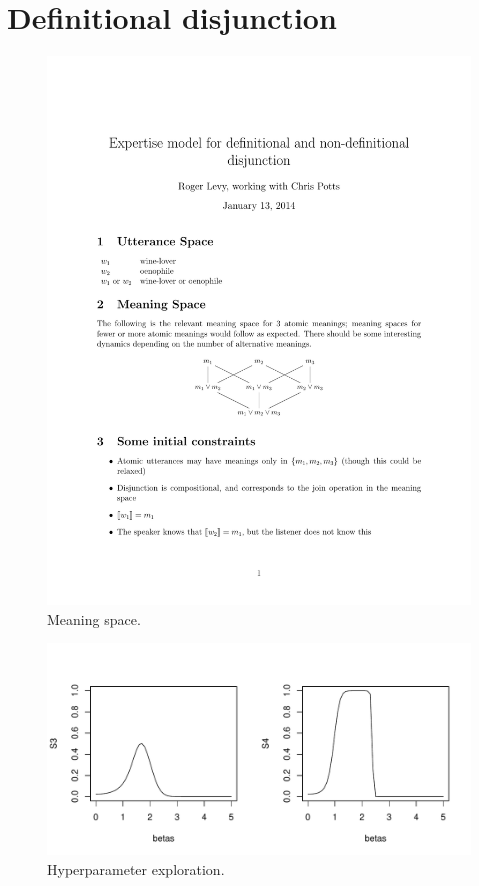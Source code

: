 \section{Definitional disjunction}\label{sec:defdisj}

\begin{figure}[htp]
  \centering
  \includegraphics[scale=1]{images/meaningspace}
  \caption{Meaning space.}
  \label{fig:meaningspace}
\end{figure}

\begin{figure}[htp]
  \centering
  \includegraphics[width=1\textwidth]{images/S3andS4}
  \caption{Hyperparameter exploration.}
  \label{fig:S3andS4}
\end{figure}


